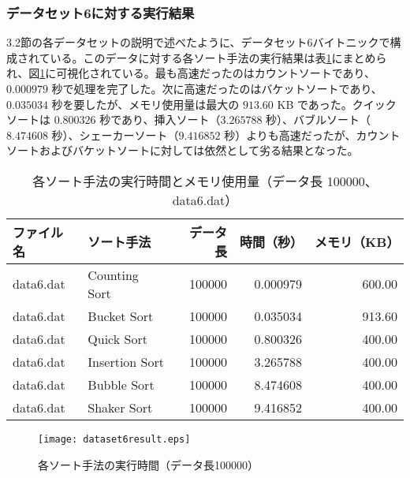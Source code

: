 \documentclass[a4j, 12pt]{jarticle}
\begin{document}
\subsubsection{データセット6に対する実行結果}
3.2節の各データセットの説明で述べたように、データセット6バイトニックで構成されている。このデータに対する各ソート手法の実行結果は表\ref{dataset6allresult}にまとめられ、図\ref{dataset6allresultgraph}に可視化されている。最も高速だったのはカウントソートであり、$0.000979$ 秒で処理を完了した。次に高速だったのはバケットソートであり、$0.035034$ 秒を要したが、メモリ使用量は最大の $913.60$ KB であった。クイックソートは $0.800326$ 秒であり、挿入ソート（$3.265788$ 秒）、バブルソート（$8.474608$ 秒）、シェーカーソート（$9.416852$ 秒）よりも高速だったが、カウントソートおよびバケットソートに対しては依然として劣る結果となった。
\begin{table}[H]
  \centering
  \caption{各ソート手法の実行時間とメモリ使用量（データ長 100000、data6.dat）}\label{dataset6allresult}
  \begin{tabular}{|l|l|r|r|r|}
    \hline
    \textbf{ファイル名} & \textbf{ソート手法} & \textbf{データ長} & \textbf{時間（秒）} & \textbf{メモリ（KB）} \\
    \hline
    data6.dat & Counting Sort  & 100000 & 0.000979  & 600.00 \\
    data6.dat & Bucket Sort    & 100000 & 0.035034  & 913.60 \\
    data6.dat & Quick Sort     & 100000 & 0.800326  & 400.00 \\
    data6.dat & Insertion Sort & 100000 & 3.265788  & 400.00 \\
    data6.dat & Bubble Sort    & 100000 & 8.474608  & 400.00 \\
    data6.dat & Shaker Sort    & 100000 & 9.416852  & 400.00 \\
    \hline
  \end{tabular}
\end{table}
\begin{figure}[H]
  \centering
  \texttt{[image: dataset6result.eps]}
  \caption{各ソート手法の実行時間（データ長100000）}\label{dataset6allresultgraph}
\end{figure}
\end{document}
